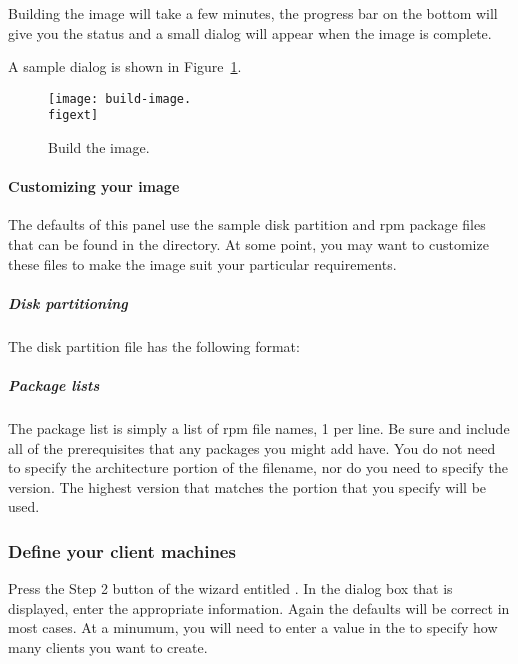Building the image will take a few minutes, the progress bar on the bottom 
will give you the status and a small dialog will appear when the image
is complete.
  
A sample dialog is shown in Figure~\ref{fig:detailed-build-image}. 

\begin{figure}[htbp]
  \begin{center}
    \texttt{[image: build-image.\\figext]}
    \caption{Build the image.}
    \label{fig:detailed-build-image}
  \end{center}
\end{figure}
  
\paragraph{Customizing your image}

The defaults of this panel use the sample disk partition and rpm package files
that can be found in the  directory.
At some point, you may want to customize these files to make the image
suit your particular requirements.

\subparagraph{Disk partitioning}

The disk partition file has the following format:

\subparagraph{Package lists}
The package list is simply a list of rpm file names, 1
per line. Be sure and include all of the prerequisites that
any packages you might add have. You do not need to specify
the architecture portion of the filename, nor do you need 
to specify the version. The highest version that matches the
portion that you specify will be used.

\subsubsection{Define your client machines} 

Press the Step 2 button of the wizard entitled . In the dialog box that is displayed, enter the
appropriate information. Again the defaults will be correct in most
cases. At a minumum, you will need to enter a value in the 
to specify how many clients you want to create.

